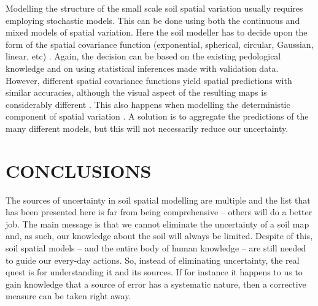 Modelling the structure of the small scale soil spatial variation usually requires employing stochastic 
models. This can be done using both the continuous and mixed models of spatial variation. Here the soil 
modeller has to decide upon the form of the spatial covariance function (exponential, spherical, circular, 
Gaussian, linear, etc) \cite{WebsterEtAl2007}. Again, the decision can be based on the existing pedological 
knowledge and on using statistical inferences made with validation data. However, different spatial covariance 
functions yield spatial predictions with similar accuracies, although the visual aspect of the resulting maps 
is considerably different \cite{Lark2000a}. This also happens when modelling the deterministic component of 
spatial variation \cite{HeungEtAl2016}. A solution is to aggregate the predictions of the many different 
models, but this will not necessarily reduce our uncertainty.

\section{CONCLUSIONS}

The sources of uncertainty in soil spatial modelling are multiple and the list that has been presented here
is far from being comprehensive -- others will do a better job. The main message is that we cannot 
eliminate the uncertainty of a soil map and, as such, our knowledge about the soil will always
be limited. Despite of this, soil spatial models -- and the entire body of human knowledge -- are still
needed to guide our every-day actions. So, instead of eliminating uncertainty, the real quest is for
understanding it and its sources. If for instance it happens to us to gain knowledge that a source of 
error has a systematic nature, then a corrective measure can be taken right away.


